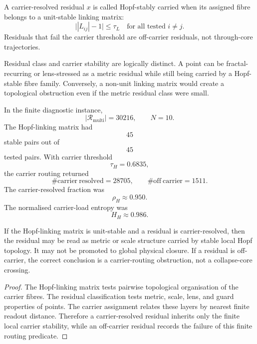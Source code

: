 \begin{definition}
A carrier-resolved residual \(x\) is called Hopf-stably carried when its
assigned fibre belongs to a unit-stable linking matrix:
\[
    \bigl||L_{ij}|-1\bigr|\leq\tau_L
    \quad
    \text{for all tested }i\neq j.
\]
Residuals that fail the carrier threshold are off-carrier residuals, not
through-core trajectories.
\end{definition}

\begin{proposition}
Residual class and carrier stability are logically distinct.  A point can be
fractal-recurring or lens-stressed as a metric residual while still being
carried by a Hopf-stable fibre family.  Conversely, a non-unit linking matrix
would create a topological obstruction even if the metric residual class were
small.
\end{proposition}

\begin{remark}
In the finite diagnostic instance,
\[
    |\mathcal R_{\mathrm{multi}}|=30216,
    \qquad
    N=10.
\]
The Hopf-linking matrix had
\[
    45
\]
stable pairs out of
\[
    45
\]
tested pairs.  With carrier threshold
\[
    \tau_H=0.6835,
\]
the carrier routing returned
\[
    \#\mathrm{carrier\ resolved}=28705,
    \qquad
    \#\mathrm{off\ carrier}=1511.
\]
The carrier-resolved fraction was
\[
    \rho_H\approx 0.950.
\]
The normalised carrier-load entropy was
\[
    H_H\approx 0.986.
\]
\end{remark}

\begin{theorem}
If the Hopf-linking matrix is unit-stable and a residual is carrier-resolved,
then the residual may be read as metric or scale structure carried by stable
local Hopf topology.  It may not be promoted to global physical closure.  If a
residual is off-carrier, the correct conclusion is a carrier-routing
obstruction, not a collapse-core crossing.
\end{theorem}

\begin{proof}
The Hopf-linking matrix tests pairwise topological organisation of the carrier
fibres.  The residual classification tests metric, scale, lens, and guard
properties of points.  The carrier assignment relates these layers by nearest
finite readout distance.  Therefore a carrier-resolved residual inherits only
the finite local carrier stability, while an off-carrier residual records the
failure of this finite routing predicate.
\end{proof}


